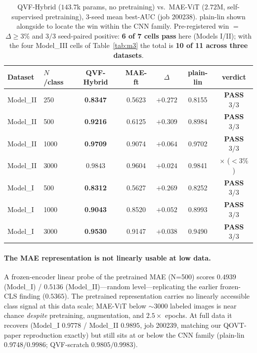\documentclass[10pt,letterpaper]{article}
\theoremstyle{plain}
\theoremstyle{definition}
\newcommand{\win}[1]{\textcolor{good}{\textbf{#1}}}
\newcommand{\lose}[1]{\textcolor{bad}{#1}}
\begin{document}
\begin{table}[h!]
\centering
\caption{QVF-Hybrid ($143.7$k params, no pretraining) vs.\ MAE-ViT
($2.72$M, self-supervised pretraining), $3$-seed mean best-AUC (job 200238).
plain-lin shown alongside to locate the win within the CNN family.
Pre-registered win $=$ $\Delta \geq 3\%$ and $3/3$ seed-paired positive:
\textbf{6 of 7 cells pass} here (Models I/II); with the four Model\_III cells of
Table~\ref{tab:m3} the total is \textbf{10 of 11 across three datasets}.}
\label{tab:mae}
\begin{tabular}{@{}llccccc@{}}
\toprule
Dataset & $N$/class & QVF-Hybrid & MAE-ft & $\Delta$ & plain-lin & verdict \\
\midrule
Model\_II & 250  & \win{0.8347} & 0.5623 & \win{$+0.272$} & 0.8155 & \win{PASS $3/3$} \\
Model\_II & 500  & \win{0.9216} & 0.6125 & \win{$+0.309$} & 0.8984 & \win{PASS $3/3$} \\
Model\_II & 1000 & \win{0.9709} & 0.9074 & \win{$+0.064$} & 0.9702 & \win{PASS $3/3$} \\
Model\_II & 3000 & 0.9843 & 0.9604 & $+0.024$ & 0.9841 & \lose{$\times$ ($<3\%$)} \\
Model\_I  & 500  & \win{0.8312} & 0.5627 & \win{$+0.269$} & 0.8252 & \win{PASS $3/3$} \\
Model\_I  & 1000 & \win{0.9043} & 0.8520 & \win{$+0.052$} & 0.8993 & \win{PASS $3/3$} \\
Model\_I  & 3000 & \win{0.9530} & 0.9147 & \win{$+0.038$} & 0.9490 & \win{PASS $3/3$} \\
\bottomrule
\end{tabular}
\end{table}

\paragraph{The MAE representation is not linearly usable at low data.}
A frozen-encoder linear probe of the pretrained MAE (N=500) scores $0.4939$
(Model\_I) / $0.5136$ (Model\_II)---random level---replicating the earlier
frozen-CLS finding ($0.5365$). The pretrained representation carries no linearly
accessible class signal at this data scale; MAE-ViT below $\sim3000$ labeled
images is near chance \emph{despite} pretraining, augmentation, and $2.5\times$
epochs. At full data it recovers (Model\_I $0.9778$ / Model\_II $0.9895$, job
200239, matching our QOVT-paper reproduction exactly) but still sits at or below
the CNN family (plain-lin $0.9748/0.9986$; QVF-scratch $0.9805/0.9983$).
\end{document}
